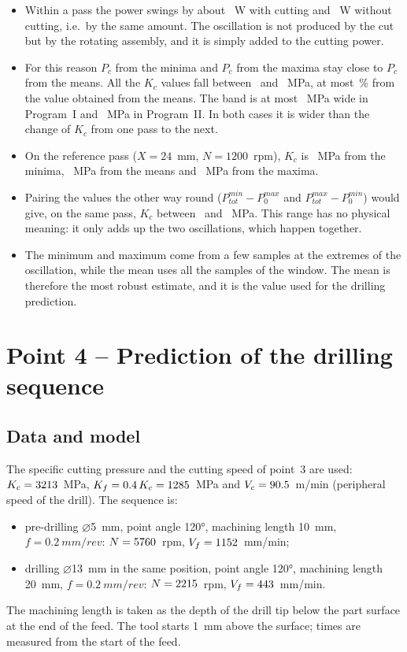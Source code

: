 \documentclass[11pt,a4paper]{article}
\begin{document}
\begin{itemize}
  \item Within a pass the power swings by about \SwingCut~W with cutting and
        \SwingAir~W without cutting, i.e.\ by the same amount. The oscillation is not
        produced by the cut but by the rotating assembly, and it is simply added to the
        cutting power.
  \item For this reason $P_c$ from the minima and $P_c$ from the maxima stay close to
        $P_c$ from the means. All the $K_c$ values fall between \KcRangeMin\ and
        \KcRangeMax~MPa, at most \DevMinMax\,\% from the value obtained from the means.
        The band is at most \BandOne~MPa wide in Program~I and \BandTwo~MPa in
        Program~II. In both cases it is wider than the change of $K_c$ from one pass to
        the next.
  \item On the reference pass ($X=24$~mm, $N=1200$~rpm), $K_c$ is \KcRefMin~MPa from
        the minima, \KcRef~MPa from the means and \KcRefMax~MPa from the maxima.
  \item Pairing the values the other way round ($P_{tot}^{min}-P_0^{max}$ and
        $P_{tot}^{max}-P_0^{min}$) would give, on the same pass, $K_c$ between
        \KcCrossLo\ and \KcCrossHi~MPa. This range has no physical meaning: it only
        adds up the two oscillations, which happen together.
  \item The minimum and maximum come from a few samples at the extremes of the
        oscillation, while the mean uses all the samples of the window. The mean is
        therefore the most robust estimate, and it is the value used for the drilling
        prediction.
\end{itemize}

\section{Point 4 -- Prediction of the drilling sequence}
\subsection{Data and model}
The specific cutting pressure and the cutting speed of point~3 are used:
$K_c=3213$~MPa, $K_f=0.4\,K_c=1285$~MPa and $V_c=90.5$~m/min (peripheral speed of
the drill). The sequence is:
\begin{itemize}
  \item pre-drilling $\varnothing$\SI{5}{mm}, point angle \ang{120}, machining length
        \SI{10}{mm}, $f=\SI{0.2}{mm/rev}$: $N=5760$~rpm, $V_f=1152$~mm/min;
  \item drilling $\varnothing$\SI{13}{mm} in the same position, point angle \ang{120},
        machining length \SI{20}{mm}, $f=\SI{0.2}{mm/rev}$: $N=2215$~rpm,
        $V_f=443$~mm/min.
\end{itemize}
The machining length is taken as the depth of the drill tip below the part surface at
the end of the feed. The tool starts \SI{1}{mm} above the surface; times are measured
from the start of the feed.
\end{document}
